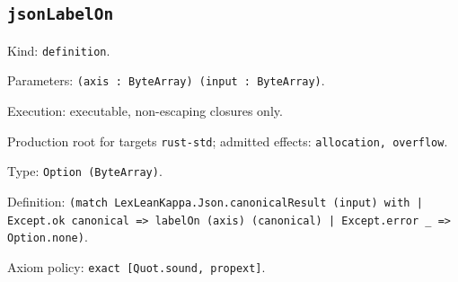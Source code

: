 \documentclass[11pt]{article}
\begin{document}
\subsection*{\texttt{jsonLabelOn}}
\noindent Kind: \texttt{definition}.\par
\noindent Parameters: \texttt{(axis : ByteArray) (input : ByteArray)}.\par
\noindent Execution: executable, non-escaping closures only.\par
\noindent Production root for targets \texttt{rust-std}; admitted effects: \texttt{allocation, overflow}.\par
\noindent Type: \texttt{Option (ByteArray)}.\par
\noindent Definition: \texttt{(match LexLeanKappa.Json.canonicalResult (input) with | Except.ok canonical => labelOn (axis) (canonical) | Except.error \_ => Option.none)}.\par
\noindent Axiom policy: \texttt{exact [Quot.sound, propext]}.\par
\end{document}
